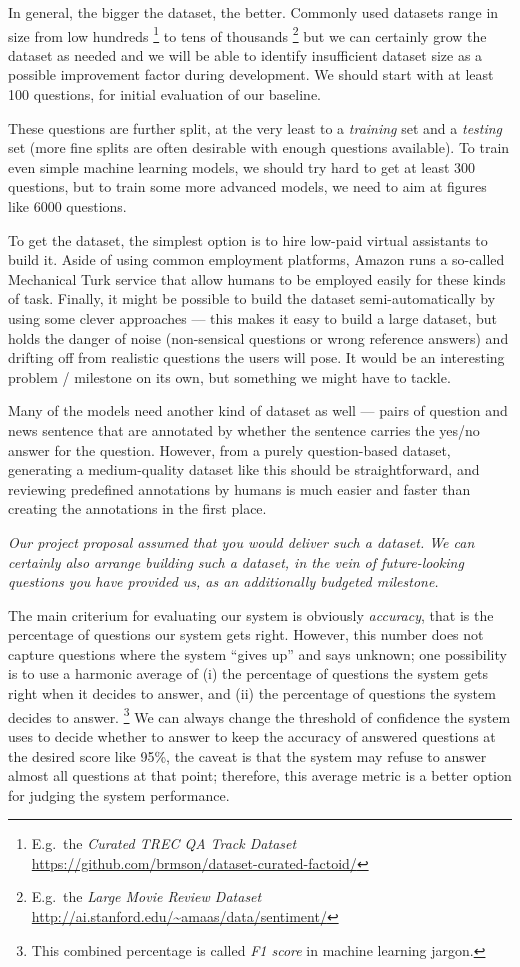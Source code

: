 \documentclass[11pt,a4paper]{article}
\begin{document}
In general, the bigger the dataset, the better.  Commonly used datasets
range in size from low hundreds%
\footnote{E.g.\ the \textit{Curated TREC QA Track Dataset} \url{https://github.com/brmson/dataset-curated-factoid/}}
to tens of thousands%
\footnote{E.g.\ the \textit{Large Movie Review Dataset} \url{http://ai.stanford.edu/~amaas/data/sentiment/}}
but we can certainly grow the dataset as needed and we will be able to identify
insufficient dataset size as a possible improvement factor during development.
We should start with at least 100 questions, for initial evaluation of our
baseline.

These questions are further split, at the very least to a \textit{training}
set and a \textit{testing} set (more fine splits are often desirable
with enough questions available).
To train even simple machine learning models, we should try hard to get
at least 300 questions, but to train some more advanced models, we need
to aim at figures like 6000 questions.

To get the dataset, the simplest option is to hire low-paid virtual assistants
to build it.  Aside of using common employment platforms, Amazon runs a
so-called Mechanical Turk service that allow humans to be employed easily
for these kinds of task.  Finally, it might be possible to build the dataset
semi-automatically by using some clever approaches --- this makes it easy
to build a large dataset, but holds the danger of noise (non-sensical questions
or wrong reference answers) and drifting off from realistic questions the
users will pose.  It would be an interesting problem / milestone on its own,
but something we might have to tackle.

Many of the models need another kind of dataset as well --- pairs of question
and news sentence that are annotated by whether the sentence carries the yes/no
answer for the question.  However, from a purely question-based dataset,
generating a medium-quality dataset like this should be straightforward,
and reviewing predefined annotations by humans is much easier and faster
than creating the annotations in the first place.

\textit{Our project proposal assumed that you would deliver such a dataset.
	We can certainly also arrange building such a dataset, in the vein
	of future-looking questions you have provided us, as an additionally
budgeted milestone.}

The main criterium for evaluating our system is obviously \textit{accuracy},
that is the percentage of questions our system gets right.  However, this
number does not capture questions where the system ``gives up'' and says
unknown; one possibility is to use a harmonic average of (i) the percentage
of questions the system gets right when it decides to answer, and (ii) the
percentage of questions the system decides to answer.%
\footnote{This combined percentage is called \textit{F1 score} in machine learning jargon.}
We can always change the threshold of confidence the system uses to decide
whether to answer to keep the accuracy of answered questions at the desired
score like 95\%, the caveat is that the system may refuse to answer almost
all questions at that point; therefore, this average metric is a better
option for judging the system performance.
\end{document}
